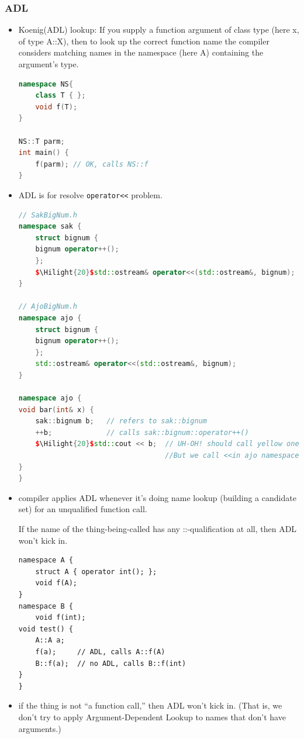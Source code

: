 \documentclass[a4paper,12pt,twoside]{book}
\newcommand{\Hilight}[1]{\makebox[0pt][l]{\color{yellow}\rule[-3pt]{#1em}{11pt}}}
\begin{document}
\subsubsection{ADL}
\begin{itemize}
	\item Koenig(ADL) lookup: If you supply a function argument of class type (here x, of type A::X), then to look up the correct function name the compiler considers matching names in the namespace (here A) containing the argument's type.
	
\begin{lstlisting}[frame=single, language=c++]
namespace NS{
	class T { };
	void f(T);
}
	
NS::T parm;
int main() {
	f(parm); // OK, calls NS::f
}
\end{lstlisting}
	
	\item ADL is for resolve \texttt{operator<<} problem.
\begin{lstlisting}[frame=single, language=c++]
// SakBigNum.h
namespace sak {
	struct bignum {
	bignum operator++();
	};
	$\Hilight{20}$std::ostream& operator<<(std::ostream&, bignum); 
}

// AjoBigNum.h
namespace ajo {
	struct bignum {
	bignum operator++();
	};
	std::ostream& operator<<(std::ostream&, bignum);
}

namespace ajo {
void bar(int& x) {
	sak::bignum b;   // refers to sak::bignum
	++b;             // calls sak::bignum::operator++()
	$\Hilight{20}$std::cout << b;  // UH-OH! should call yellow one
	                               //But we call <<in ajo namespace.
}
}
\end{lstlisting}

	\item compiler applies ADL whenever it’s doing name lookup (building a candidate set) for an unqualified function call.
	
	If the name of the thing-being-called has any ::-qualification at all, then ADL won’t kick in.
	
\begin{lstlisting}
namespace A {
	struct A { operator int(); };
	void f(A);
}
namespace B {
	void f(int);
void test() {
	A::A a;
	f(a);     // ADL, calls A::f(A)
	B::f(a);  // no ADL, calls B::f(int)
}
}
\end{lstlisting}
	
	\item  if the thing is not “a function call,” then ADL won’t kick in. (That is, we don’t try to apply Argument-Dependent Lookup to names that don’t have arguments.) 
	

\end{itemize}
\end{document}
